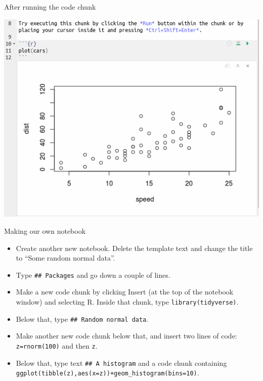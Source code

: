 \documentclass[
  ignorenonframetext,
]{beamer}
\providecommand{\tightlist}{%
  \setlength{\itemsep}{0pt}\setlength{\parskip}{0pt}}
\begin{document}
\begin{frame}{After running the code chunk}
\protect\hypertarget{after-running-the-code-chunk}{}

\includegraphics{Screenshot_2018-06-29_16-49-00.png}

\end{frame}

\begin{frame}[fragile]{Making our own notebook}
\protect\hypertarget{making-our-own-notebook}{}

\begin{itemize}
\tightlist
\item
  Create another new notebook. Delete the template text and change the
  title to ``Some random normal data''.
\item
  Type \texttt{\#\#\ Packages} and go down a couple of lines.
\item
  Make a new code chunk by clicking Insert (at the top of the notebook
  window) and selecting R. Inside that chunk, type
  \texttt{library(tidyverse)}.
\item
  Below that, type \texttt{\#\#\ Random\ normal\ data}.
\item
  Make another new code chunk below that, and insert two lines of code:
  \texttt{z=rnorm(100)} and then \texttt{z}.
\item
  Below that, type text \texttt{\#\#\ A\ histogram} and a code chunk
  containing
  \texttt{ggplot(tibble(z),aes(x=z))+geom\_histogram(bins=10)}.
\end{itemize}

\end{frame}
\end{document}

